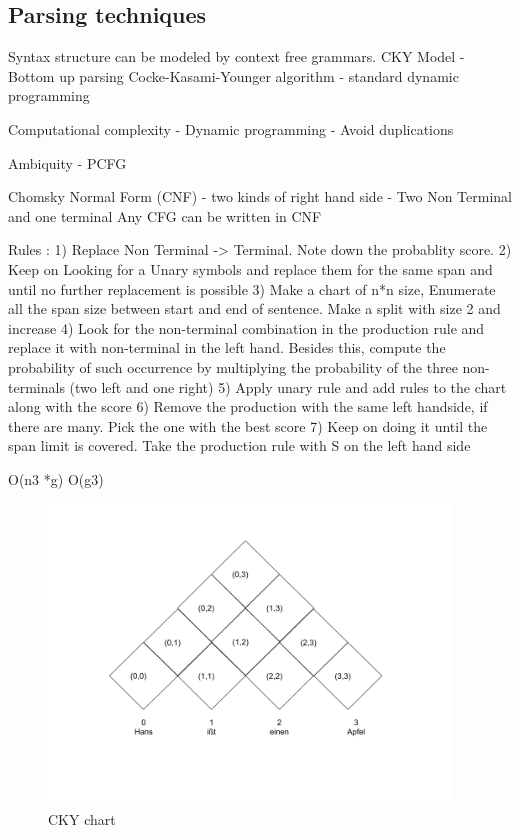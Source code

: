 \documentclass[a4paper, 11pt]{article}
\begin{document}
\subsection{Parsing techniques}

Syntax structure can be modeled by context free grammars. 
CKY Model - Bottom up parsing
Cocke-Kasami-Younger algorithm - standard dynamic programming

\parencite{YOUNGER1967189}

Computational complexity
 - Dynamic programming 
	 - Avoid duplications
  
 
 Ambiquity
  - PCFG 
 
Chomsky Normal Form (CNF) - two kinds of right hand side
 - Two Non Terminal and one terminal
 Any CFG can be written in CNF
 
 
Rules :
1) Replace Non Terminal -> Terminal.  Note down the probablity score. 
2) Keep on Looking for a Unary symbols and replace them for the same span and until no further replacement is possible
3) Make a chart of n*n size, Enumerate all the span size between start and end of sentence. Make a split with size 2 and increase
4) Look for the non-terminal combination in the production rule and replace it with non-terminal in the left hand. Besides this, compute the probability of such occurrence by multiplying the probability of the three non-terminals (two left and one right)
5) Apply unary rule and add rules to the chart along with the score
6) Remove the production with the same left handside, if there are many. Pick the one with the best score
7) Keep on doing it until the span limit is covered. Take the production rule with S on the left hand side

O(n3 *g)
O(g3)

\begin{figure}[htpb]
    \centering
    \includegraphics[width=\textwidth,height=8cm,keepaspectratio=true]
    {cky-parsing-chart-1.png}
    \caption{
        CKY chart
    }
    \label{fig:cky_parser_1}
\end{figure}
\end{document}
